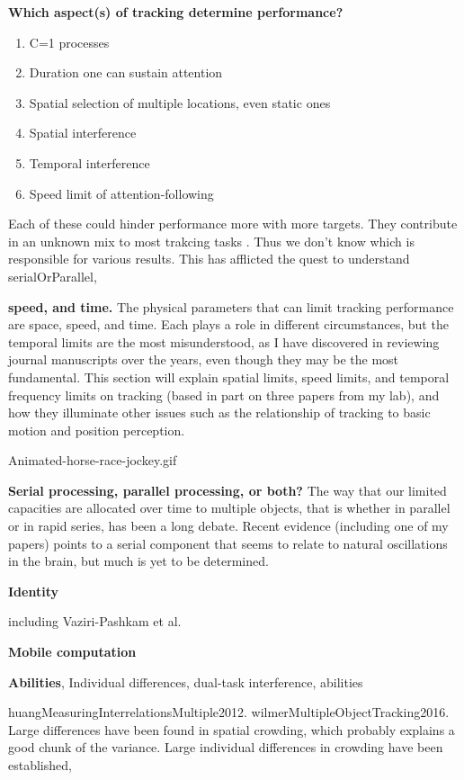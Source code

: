 \documentclass[]{book}
\providecommand{\tightlist}{%
  \setlength{\itemsep}{0pt}\setlength{\parskip}{0pt}}
\begin{document}
\textbf{Which aspect(s) of tracking determine performance?}

\begin{enumerate}
\def\labelenumi{\arabic{enumi}.}
\tightlist
\item
  C=1 processes
\item
  Duration one can sustain attention
\item
  Spatial selection of multiple locations, even static ones
\item
  Spatial interference
\item
  Temporal interference
\item
  Speed limit of attention-following
\end{enumerate}

Each of these could hinder performance more with more targets. They contribute in an unknown mix to most trakcing tasks .
Thus we don't know which is responsible for various results. This has afflicted the quest to understand serialOrParallel,

\textbf{speed, and time.} The physical parameters that can limit tracking performance are space, speed, and time. Each plays a role in different circumstances, but the temporal limits are the most misunderstood, as I have discovered in reviewing journal manuscripts over the years, even though they may be the most fundamental. This section will explain spatial limits, speed limits, and temporal frequency limits on tracking (based in part on three papers from my lab), and how they illuminate other issues such as the relationship of tracking to basic motion and position perception.

Animated-horse-race-jockey.gif

\textbf{Serial processing, parallel processing, or both?} The way that our limited capacities are allocated over time to multiple objects, that is whether in parallel or in rapid series, has been a long debate. Recent evidence (including one of my papers) points to a serial component that seems to relate to natural oscillations in the brain, but much is yet to be determined.

\textbf{Identity}

including Vaziri-Pashkam et al.

\textbf{Mobile computation}

\textbf{Abilities}, Individual differences, dual-task interference, abilities

huangMeasuringInterrelationsMultiple2012. wilmerMultipleObjectTracking2016. Large differences have been found in spatial crowding, which probably explains a good chunk of the variance. Large individual differences in crowding have been established,
\end{document}
